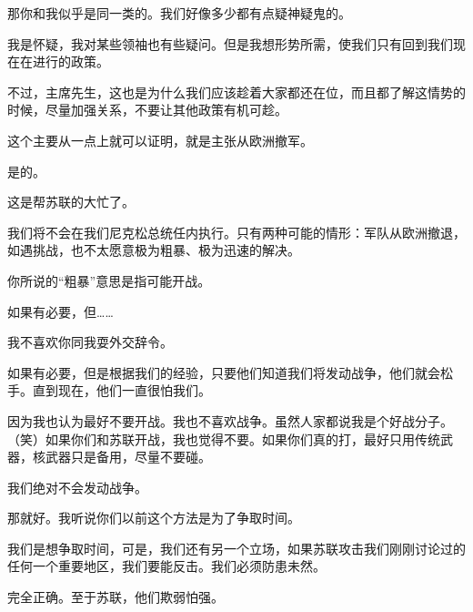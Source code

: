 那你和我似乎是同一类的。我们好像多少都有点疑神疑鬼的。

我是怀疑，我对某些领袖也有些疑问。但是我想形势所需，使我们只有回到我们现在在进行的政策。

不过，主席先生，这也是为什么我们应该趁着大家都还在位，而且都了解这情势的时候，尽量加强关系，不要让其他政策有机可趁。

这个主要从一点上就可以证明，就是主张从欧洲撤军。

是的。

这是帮苏联的大忙了。

我们将不会在我们尼克松总统任内执行。只有两种可能的情形：军队从欧洲撤退，如遇挑战，也不太愿意极为粗暴、极为迅速的解决。

你所说的“粗暴”意思是指可能开战。

如果有必要，但……

我不喜欢你同我耍外交辞令。

如果有必要，但是根据我们的经验，只要他们知道我们将发动战争，他们就会松手。直到现在，他们一直很怕我们。

因为我也认为最好不要开战。我也不喜欢战争。虽然人家都说我是个好战分子。（笑）如果你们和苏联开战，我也觉得不要。如果你们真的打，最好只用传统武器，核武器只是备用，尽量不要碰。

我们绝对不会发动战争。

那就好。我听说你们以前这个方法是为了争取时间。

我们是想争取时间，可是，我们还有另一个立场，如果苏联攻击我们刚刚讨论过的任何一个重要地区，我们要能反击。我们必须防患未然。

完全正确。至于苏联，他们欺弱怕强。

